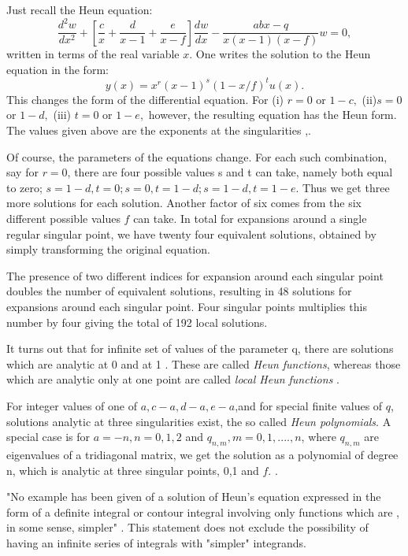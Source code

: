\documentclass{article}
\begin{document}
\noindent Just recall the Heun equation:
\begin{equation}
\frac {d^{2}w}{dx^{2}} + [\frac {c}{x} + \frac{ d}{x-1} + \frac{
e}{x-f}] \frac{dw}{dx} - \frac{abx-q}{x(x-1)(x-f)}w = 0 ,
\end{equation}%
written in terms of the real variable $x$. One writes the solution
to the Heun equation in the form:
$$ y(x) = x^{r}
(x-1)^{s} (1-x/f)^{t} u(x).$$ This changes the form of the
differential equation. For
 (i) $ r=0$  or $1-c ,$
 (ii)$ s =0$ or $1-d,$
 (iii)
$t = 0$ or $1-e,$
 however, the resulting equation has the Heun form.
The values given above are the exponents at the singularities
\cite{Arscott},\cite{Ronveaux2}.

\noindent Of course, the parameters of the equations change. For
each such combination, say for $r=0$, there are four possible
values s and t can take, namely both equal to zero; $s=1-d, t=0;
s=0, t= 1-d; s=1-d, t= 1-e.$ Thus we get three more solutions for
each solution. Another factor of six comes from the six different
possible values $f$ can take. In total for expansions around a
single regular singular point, we have twenty four equivalent
solutions, obtained by simply transforming the original equation.


\noindent The presence of two different indices for expansion
around each singular point doubles the number of equivalent
solutions, resulting in 48 solutions for expansions around each
singular point. Four singular points multiplies this number by
four giving the total of 192 local solutions.


\noindent It turns out that for infinite set of values of the
parameter q, there are solutions which are analytic at 0 and at 1
. These are called \emph{Heun functions}, whereas those which are
analytic only at one point are called \emph{local Heun functions}
\cite{ronveaux11}.


\noindent For integer values of one of $a, c-a,d-a,e-a$,and for
special finite values of $q$, solutions analytic at three
singularities exist, the so called \emph{ Heun polynomials}. A
special case is for $a = -n, n=0,1,2$ and $q_{n,m} , m=0,1, ....,
n $, where $q_{n,m}$ are eigenvalues of a tridiagonal matrix, we
get the solution as a polynomial of degree n, which is analytic at
three singular points, 0,1 and $f$.
 \cite{ronveaux41}.

\noindent "No example has been given of a solution of Heun's
equation expressed in the form of a definite integral or contour
integral involving only functions which are , in some sense,
simpler" \cite{Ronveaux1}. This  statement  does not exclude the
possibility of having an infinite series of integrals  with
"simpler" integrands.
\end{document}
